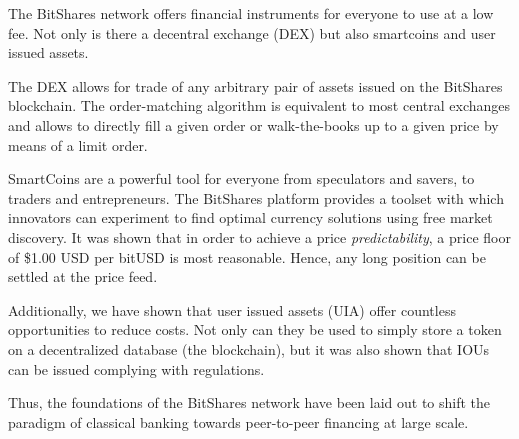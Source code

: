 The BitShares network offers financial instruments for everyone to use at a low
fee. Not only is there a decentral exchange (DEX) but also smartcoins and user
issued assets.

The DEX allows for trade of any arbitrary pair of assets issued on the
BitShares blockchain. The order-matching algorithm is equivalent to most
central exchanges and allows to directly fill a given order or walk-the-books
up to a given price by means of a limit order.

SmartCoins are a powerful tool for everyone from speculators and savers, to
traders and entrepreneurs. The BitShares platform provides a toolset with which
innovators can experiment to find optimal currency solutions using free market
discovery. It was shown that in order to achieve a price \emph{predictability},
a price floor of \$1.00 USD per bitUSD is most reasonable. Hence, any long
position can be settled at the price feed.

Additionally, we have shown that user issued assets (UIA) offer countless
opportunities to reduce costs. Not only can they be used to simply store a
token on a decentralized database (the blockchain), but it was also shown that
IOUs can be issued complying with regulations.


Thus, the foundations of the BitShares network have been laid out to shift the
paradigm of classical banking towards peer-to-peer financing at large scale.
